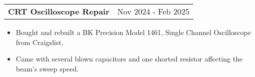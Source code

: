 \documentclass{article}
\begin{document}
    \raggedright\begin{tabular}{lr}
        \parbox[l]{3.65in}{\bf{\large{CRT Oscilloscope Repair}}} &
        \parbox[r]{3.65in}{\raggedleft Nov 2024 - Feb 2025} \\
    \end{tabular}
    \begin{itemize} \vspace{-5pt}
        \setlength{\itemsep}{-2pt}
        \item Bought and rebuilt a BK Precision Model 1461, Single Channel Oscilloscope from Craigslist.
        \item Came with several blown capacitors and one shorted resistor affecting the beam's sweep speed.
    \end{itemize}
\end{document}

